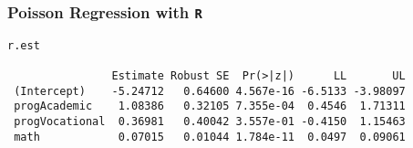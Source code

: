 \documentclass[00-GLMregslides.tex]{subfiles}
\begin{document}
\begin{frame}[fragile]

\frametitle{Poisson Regression with \texttt{R}}
\Large 

\begin{framed}
\begin{verbatim}
r.est
 
                Estimate Robust SE  Pr(>|z|)      LL       UL
 (Intercept)    -5.24712   0.64600 4.567e-16 -6.5133 -3.98097
 progAcademic    1.08386   0.32105 7.355e-04  0.4546  1.71311
 progVocational  0.36981   0.40042 3.557e-01 -0.4150  1.15463
 math            0.07015   0.01044 1.784e-11  0.0497  0.09061
\end{verbatim}
\end{framed}

\end{frame}

\end{document}
